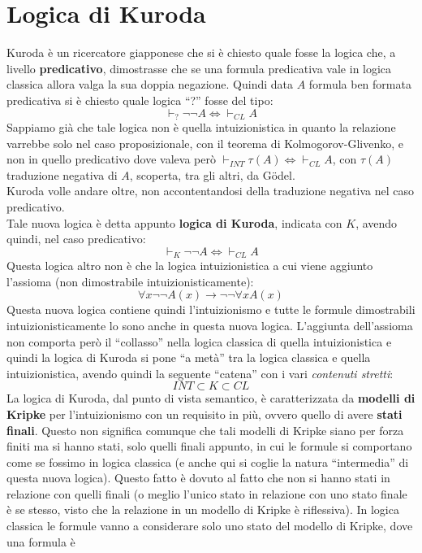 \documentclass[a4paper,12pt, oneside]{book}
\begin{document}
\chapter{Logica di Kuroda}
Kuroda è un ricercatore giapponese che si è chiesto quale fosse la logica che, a
livello \textbf{predicativo}, dimostrasse che se una formula predicativa vale in
logica classica allora valga la sua doppia negazione.
Quindi data $A$ formula ben formata predicativa si è chiesto quale logica ``?''
fosse del tipo:
\[\vdash_? \neg\neg A\iff\vdash_{CL}A\]
Sappiamo già che tale logica non è quella intuizionistica in quanto la relazione
varrebbe solo nel caso proposizionale, con il teorema di Kolmogorov-Glivenko, e
non in quello predicativo dove valeva però $\vdash_{INT}
\tau(A)\iff\vdash_{CL}A$, con $\tau(A)$ traduzione negativa di $A$, scoperta,
tra gli altri, da G\"{o}del.\\
Kuroda volle andare oltre, non accontentandosi della traduzione negativa nel
caso predicativo.\\
Tale nuova logica è detta appunto \textbf{logica di Kuroda}, indicata con $K$,
avendo quindi, nel caso predicativo:
\[\vdash_K \neg\neg A\iff\vdash_{CL}A\]
Questa logica altro non è che la logica intuizionistica a cui viene aggiunto
l'assioma (non dimostrabile intuizionisticamente):
\[\forall x\neg\neg A(x)\to\neg\neg\forall xA(x)\]
Questa nuova logica contiene quindi l'intuizionismo e tutte le formule
dimostrabili intuizionisticamente lo sono anche in questa nuova
logica. L'aggiunta dell'assioma non comporta però il ``collasso'' nella logica
classica di quella intuizionistica e quindi la logica di Kuroda si pone ``a
metà'' tra la logica classica e quella intuizionistica, avendo quindi la
seguente ``catena'' con i vari \textit{contenuti stretti}:
\[INT\subset K\subset CL\]
La logica di Kuroda, dal punto di vista semantico, è caratterizzata da
\textbf{modelli di Kripke} per l'intuizionismo con un requisito in più, ovvero
quello di avere \textbf{stati finali}. Questo non significa comunque che tali
modelli di Kripke siano per forza finiti ma si hanno stati, solo quelli finali
appunto, in cui le formule si comportano come se fossimo in logica classica (e
anche qui si coglie la natura ``intermedia'' di questa nuova logica). Questo
fatto è dovuto al fatto che non si hanno stati in relazione con quelli finali (o
meglio 
l'unico stato in relazione con uno stato finale è se stesso, visto che la
relazione in un modello di Kripke è riflessiva). In logica classica le formule
vanno a considerare solo uno stato del modello di Kripke, dove una formula è
\end{document}
